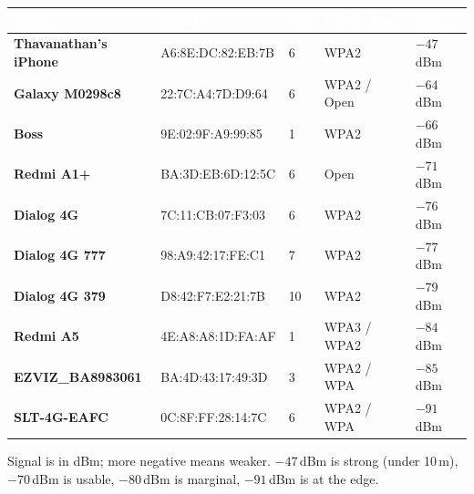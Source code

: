 \documentclass[12pt,a4paper]{article}
\begin{document}
\vspace{4pt}
\begin{tabularx}{\textwidth}{>{\bfseries\footnotesize}X >{\footnotesize}l >{\centering\arraybackslash\footnotesize}p{0.6cm} >{\footnotesize}l >{\centering\arraybackslash\footnotesize}p{1.5cm}}
\arrayrulecolor{accent!40}
\toprule
\rowcolor{tableheadbg}
\textcolor{white}{\textbf{SSID}} &
\textcolor{white}{\textbf{BSSID}} &
\textcolor{white}{\textbf{Ch.}} &
\textcolor{white}{\textbf{Encryption}} &
\textcolor{white}{\textbf{Signal}} \\
\midrule
Thavanathan's iPhone  & A6:8E:DC:82:EB:7B & 6  & WPA2          & $-47$ dBm \\
\rowcolor{tablerowalt}
Galaxy M0298c8        & 22:7C:A4:7D:D9:64 & 6  & WPA2 / Open   & $-64$ dBm \\
Boss                  & 9E:02:9F:A9:99:85 & 1  & WPA2          & $-66$ dBm \\
\rowcolor{tablerowalt}
Redmi A1+             & BA:3D:EB:6D:12:5C & 6  & Open          & $-71$ dBm \\
Dialog 4G             & 7C:11:CB:07:F3:03 & 6  & WPA2          & $-76$ dBm \\
\rowcolor{tablerowalt}
Dialog 4G 777         & 98:A9:42:17:FE:C1 & 7  & WPA2          & $-77$ dBm \\
Dialog 4G 379         & D8:42:F7:E2:21:7B & 10 & WPA2          & $-79$ dBm \\
\rowcolor{tablerowalt}
Redmi A5              & 4E:A8:A8:1D:FA:AF & 1  & WPA3 / WPA2   & $-84$ dBm \\
EZVIZ\_BA8983061      & BA:4D:43:17:49:3D & 3  & WPA2 / WPA    & $-85$ dBm \\
\rowcolor{tablerowalt}
SLT-4G-EAFC           & 0C:8F:FF:28:14:7C & 6  & WPA2 / WPA    & $-91$ dBm \\
\bottomrule
\end{tabularx}
\vspace{4pt}

Signal is in dBm; more negative means weaker. $-47$\,dBm is strong (under 10\,m), $-70$\,dBm is usable, $-80$\,dBm is marginal, $-91$\,dBm is at the edge.
\end{document}
